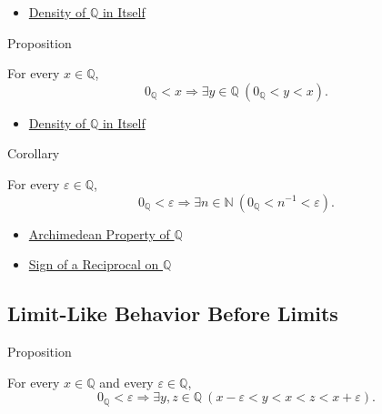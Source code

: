 \begin{dependencies}
\begin{itemize}
  \item \hyperref[thm:density-of-q]{Density of $\mathbb{Q}$ in Itself}
\end{itemize}
\end{dependencies}

\begin{propositionbox}{Proposition}
\begin{proposition}
\label{prop:no-least-positive-rational}
For every $x\in\mathbb{Q}$,
\[
0_{\mathbb{Q}}<x
\Longrightarrow
\exists y\in\mathbb{Q}\ (0_{\mathbb{Q}}<y<x).
\]
\end{proposition}
\end{propositionbox}

\begin{dependencies}
\begin{itemize}
  \item \hyperref[thm:density-of-q]{Density of $\mathbb{Q}$ in Itself}
\end{itemize}
\end{dependencies}

\begin{corollarybox}{Corollary}
\begin{corollary}
\label{cor:reciprocals-arbitrarily-small-q}
For every $\varepsilon\in\mathbb{Q}$,
\[
0_{\mathbb{Q}}<\varepsilon
\Longrightarrow
\exists n\in\mathbb{N}\ 
\left(0_{\mathbb{Q}}<n^{-1}<\varepsilon\right).
\]
\end{corollary}
\end{corollarybox}

\begin{dependencies}
\begin{itemize}
  \item \hyperref[thm:archimedean-property-of-q]{Archimedean Property of $\mathbb{Q}$}
  \item \hyperref[thm:sign-of-reciprocal-q]{Sign of a Reciprocal on $\mathbb{Q}$}
\end{itemize}
\end{dependencies}

\subsection*{Limit-Like Behavior Before Limits}

\begin{propositionbox}{Proposition}
\begin{proposition}
\label{prop:one-sided-rational-approximation}
For every $x\in\mathbb{Q}$ and every $\varepsilon\in\mathbb{Q}$,
\[
0_{\mathbb{Q}}<\varepsilon
\Longrightarrow
\exists y,z\in\mathbb{Q}\ (x-\varepsilon<y<x<z<x+\varepsilon).
\]
\end{proposition}
\end{propositionbox}

